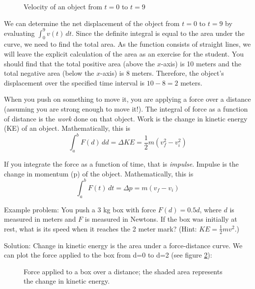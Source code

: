 \begin{figure}[htbp]
	\caption{Velocity of an object from $t=0$ to $t=9$}
	\label{fig:velocity}
\end{figure}

We can determine the net displacement of the object from $t=0$ to $t=9$ by evaluating $\int_{0}^{9}v(t)\,dt$. Since the definite integral is equal to the area under the curve, we need to find the total area. As the function consists of straight lines, we will leave the explicit calculation of the area as an exercise for the student. You should find that the total positive area (above the $x$-axis) is 10 meters and the total negative area (below the $x$-axis) is 8 meters. Therefore, the object's displacement over the specified time interval is $10-8=2$ meters. 

When you push on something to move it, you are applying a force over a distance (assuming you are strong enough to move it!). The integral of force as a function of distance is the \textit{work} done on that object.  Work is the change in kinetic energy (KE) of an object. Mathematically, this is $$\int_{a}^{b}F(d)\,dd=\Delta KE=\frac{1}{2}m(v_f^2-v_i^2)$$

If you integrate the force as a function of time, that is \textit{impulse}. Impulse is the change in momentum (p) of the object. Mathematically, this is $$\int_{a}^{b}F(t)\,dt=\Delta p=m(v_f-v_i)$$

Example problem: You push a 3 kg box with force $F(d) = 0.5d$, where $d$ is measured in meters and $F$ is measured in Newtons. If the box was initially at rest, what is its speed when it reaches the 2 meter mark? (Hint: $KE=\frac{1}{2}mv^2$.) 

Solution: Change in kinetic energy is the area under a force-distance curve. We can plot the force applied to the box from d=0 to d=2 (see figure \ref{fig:KEbox}):

\begin{figure}[htbp]
 \caption{Force applied to a box over a distance; the shaded area represents the change in kinetic energy.}
 \label{fig:KEbox}
\end{figure}

